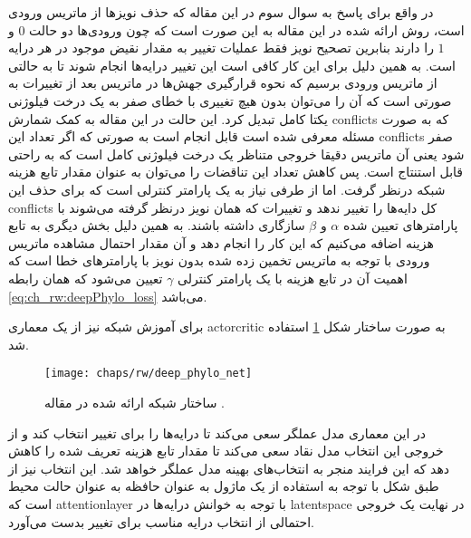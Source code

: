 در واقع برای پاسخ به سوال سوم در این مقاله که حذف نویزها از ماتریس ورودی است، روش ارائه شده در این مقاله به این صورت است که چون ورودی‌ها دو حالت $0$ و $1$ را دارند بنابرین تصحیح نویز فقط عملیات تغییر به مقدار نقیض موجود در هر درایه است. به همین دلیل برای این کار کافی است این تغییر درایه‌ها انجام شوند تا به حالتی از ماتریس ورودی برسیم که نحوه قرارگیری جهش‌ها در ماتریس بعد از تغییرات به صورتی است که آن را می‌توان بدون هیچ تغییری با خطای صفر به یک درخت فیلوژنی یکتا کامل تبدیل کرد. این حالت در این مقاله به کمک شمارش \glspl{conflict} که به صورت مسئله  معرفی شده است قابل انجام است به صورتی که اگر تعداد این \glspl{conflict} صفر شود یعنی آن ماتریس دقیقا خروجی متناظر یک درخت فیلوژنی کامل است که به راحتی قابل استنتاج است. پس کاهش تعداد این تناقضات را می‌توان به عنوان مقدار تابع هزینه شبکه درنظر گرفت. اما از طرفی نیاز به یک پارامتر کنترلی است که برای حذف این \glspl{conflict}‌ کل دایه‌ها را تغییر ندهد و تغییرات که همان نویز درنظر گرفته می‌شوند با پارامترهای تعیین شده $\alpha$ و $\beta$ سازگاری داشته باشند. به همین دلیل بخش دیگری به تابع هزینه اضافه می‌کنیم که این کار را انجام دهد و آن مقدار احتمال مشاهده ماتریس ورودی با توجه به ماتریس تخمین زده شده بدون نویز با پارامترهای خطا است که اهمیت آن در تابع هزینه با یک پارامتر کنترلی $\gamma$ تعیین می‌شود که همان رابطه \ref{eq:ch_rw:deepPhylo_loss} می‌باشد.

برای آموزش شبکه نیز از یک معماری \gls{actorcritic} به صورت ساختار شکل \ref{fig:ch_rw:deep_phylo_net} استفاده شد.

\begin{figure}[!ht]
	\centerline{\texttt{[image: chaps/rw/deep\_phylo\_net]}}
	\caption{ساختار شبکه ارائه شده در مقاله \cite{azer2020tumor}.}
	\label{fig:ch_rw:deep_phylo_net}
\end{figure}

در این معماری مدل عملگر سعی می‌کند تا درایه‌ها را برای تغییر انتخاب کند و از خروجی این انتخاب مدل نقاد سعی می‌کند تا مقدار تابع هزینه تعریف شده را کاهش دهد که این فرایند منجر به انتخاب‌های بهینه مدل عملگر خواهد شد. این انتخاب نیز از طبق شکل با توجه به استفاده از یک ماژول  به عنوان حافظه به عنوان حالت محیط است که \gls{attentionlayer} با توجه به خوانش درایه‌ها در \gls{latentspace} در نهایت یک خروجی احتمالی از انتخاب درایه مناسب برای تغییر بدست می‌آورد.

